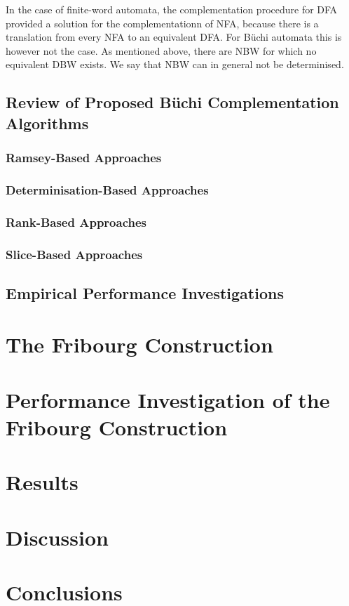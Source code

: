 \documentclass{scrreprt}
\begin{document}
In the case of finite-word automata, the complementation procedure for DFA provided a solution for the complementationn of NFA, because there is a translation from every NFA to an equivalent DFA. For Büchi automata this is however not the case. As mentioned above, there are NBW for which no equivalent DBW exists. We say that NBW can in general not be determinised.

\section{Review of Proposed Büchi Complementation Algorithms}
\subsection{Ramsey-Based Approaches}
\subsection{Determinisation-Based Approaches}
\subsection{Rank-Based Approaches}
\subsection{Slice-Based Approaches}

\section{Empirical Performance Investigations}

\chapter{The Fribourg Construction}

\chapter{Performance Investigation of the Fribourg Construction}

\chapter{Results}

\chapter{Discussion}

\chapter{Conclusions}
\end{document}
